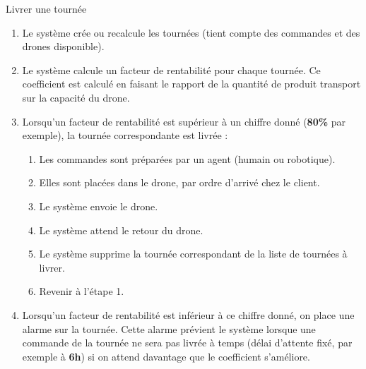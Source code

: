 \begin{UseCase}{Livrer une tournée}
\begin{UseCaseScenario}
    \begin{enumerate}
        \item Le système crée ou recalcule les tournées (tient compte des
            commandes et des drones disponible).
        \item Le système calcule un facteur de rentabilité pour chaque tournée.
            Ce coefficient est calculé en faisant le rapport de la quantité de
            produit transport sur la capacité du drone.
        \item Lorsqu'un facteur de rentabilité est supérieur à un chiffre
            donné (\textbf{80\%} par exemple), la tournée correspondante est livrée :
            \begin{enumerate}[label={\theenumi\alph*.}]
                \item Les commandes sont préparées par un agent (humain ou
                    robotique).
                \item Elles sont placées dans le drone, par ordre d'arrivé chez
                    le client.
                \item Le système envoie le drone.
                \item Le système attend le retour du drone.
                \item Le système supprime la tournée correspondant de la liste
                    de tournées à livrer.
                \item Revenir à l'étape 1.
            \end{enumerate}
        \item Lorsqu'un facteur de rentabilité est inférieur à ce chiffre
            donné, on place une alarme sur la tournée. Cette alarme prévient le
            système lorsque une commande de la tournée ne sera pas livrée à
            temps (délai d'attente fixé, par exemple à \textbf{6h}) si on
            attend davantage que le coefficient s'améliore.
    \end{enumerate}
\end{UseCaseScenario}


\end{UseCase}
